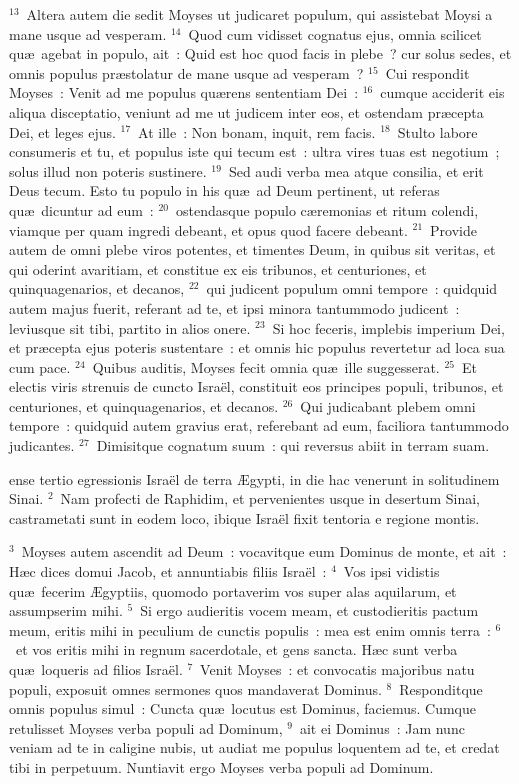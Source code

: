 ${}^{13}$~Altera autem die sedit Moyses ut judicaret populum, qui assistebat Moysi a mane usque ad vesperam.
${}^{14}$~Quod cum vidisset cognatus ejus, omnia scilicet qu\ae\ agebat in populo, ait~: Quid est hoc quod facis in plebe~? cur solus sedes, et omnis populus pr\ae stolatur de mane usque ad vesperam~?
${}^{15}$~Cui respondit Moyses~: Venit ad me populus qu\ae rens sententiam Dei~:
${}^{16}$~cumque acciderit eis aliqua disceptatio, veniunt ad me ut judicem inter eos, et ostendam pr\ae cepta Dei, et leges ejus.
${}^{17}$~At ille~: Non bonam, inquit, rem facis.
${}^{18}$~Stulto labore consumeris et tu, et populus iste qui tecum est~: ultra vires tuas est negotium~; solus illud non poteris sustinere.
${}^{19}$~Sed audi verba mea atque consilia, et erit Deus tecum. Esto tu populo in his qu\ae\ ad Deum pertinent, ut referas qu\ae\ dicuntur ad eum~:
${}^{20}$~ostendasque populo c\ae remonias et ritum colendi, viamque per quam ingredi debeant, et opus quod facere debeant.
${}^{21}$~Provide autem de omni plebe viros potentes, et timentes Deum, in quibus sit veritas, et qui oderint avaritiam, et constitue ex eis tribunos, et centuriones, et quinquagenarios, et decanos,
${}^{22}$~qui judicent populum omni tempore~: quidquid autem majus fuerit, referant ad te, et ipsi minora tantummodo judicent~: leviusque sit tibi, partito in alios onere.
${}^{23}$~Si hoc feceris, implebis imperium Dei, et pr\ae cepta ejus poteris sustentare~: et omnis hic populus revertetur ad loca sua cum pace.
${}^{24}$~Quibus auditis, Moyses fecit omnia qu\ae\ ille suggesserat.
${}^{25}$~Et electis viris strenuis de cuncto Isra\"el, constituit eos principes populi, tribunos, et centuriones, et quinquagenarios, et decanos.
${}^{26}$~Qui judicabant plebem omni tempore~: quidquid autem gravius erat, referebant ad eum, faciliora tantummodo judicantes.
${}^{27}$~Dimisitque cognatum suum~: qui reversus abiit in terram suam.

\bchapter
{}ense tertio egressionis Isra\"el de terra \AE gypti, in die hac venerunt in solitudinem Sinai.
${}^{2}$~Nam profecti de Raphidim, et pervenientes usque in desertum Sinai, castrametati sunt in eodem loco, ibique Isra\"el fixit tentoria e regione montis.


${}^{3}$~Moyses autem ascendit ad Deum~: vocavitque eum Dominus de monte, et ait~: H\ae c dices domui Jacob, et annuntiabis filiis Isra\"el~:
${}^{4}$~Vos ipsi vidistis qu\ae\ fecerim \AE gyptiis, quomodo portaverim vos super alas aquilarum, et assumpserim mihi.
${}^{5}$~Si ergo audieritis vocem meam, et custodieritis pactum meum, eritis mihi in peculium de cunctis populis~: mea est enim omnis terra~:
${}^{6}$~et vos eritis mihi in regnum sacerdotale, et gens sancta. H\ae c sunt verba qu\ae\ loqueris ad filios Isra\"el.
${}^{7}$~Venit Moyses~: et convocatis majoribus natu populi, exposuit omnes sermones quos mandaverat Dominus.
${}^{8}$~Responditque omnis populus simul~: Cuncta qu\ae\ locutus est Dominus, faciemus. Cumque retulisset Moyses verba populi ad Dominum,
${}^{9}$~ait ei Dominus~: Jam nunc veniam ad te in caligine nubis, ut audiat me populus loquentem ad te, et credat tibi in perpetuum. Nuntiavit ergo Moyses verba populi ad Dominum.


